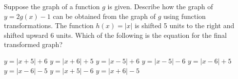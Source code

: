 \documentclass[11pt,answers]{exam}
\let\originalleft\left
\let\originalright\right
\renewcommand{\left}{\mathopen{}\mathclose\bgroup\originalleft}
\renewcommand{\right}{\aftergroup\egroup\originalright}
\begin{document}
\begin{questions}
\bonusquestion[2] Suppose the graph of a function $g$ is given. Describe how the graph of $\displaystyle y = 2g(x) - 1$ can be obtained from the graph of $g$ using function transformations.    
\fillwithdottedlines{3cm}
\bonusquestion[1] The function $\displaystyle h(x)=|x|$ is shifted 5 units to the right and shifted upward 6 units. Which of the following is the equation for the final transformed graph?
 
\begin{oneparchoices}
\choice $y=|x+5|+6$ \choice $y=|x+6|+5$	\choice $y=|x-5|+6$ \choice $y=|x-5|-6$ \choice $y=|x-6|+5$ \choice $y=|x-6|-5$ \choice $y=|x+5|-6$ \choice $y=|x+6|-5$
	\end{oneparchoices}
\end{questions}
\end{document}
